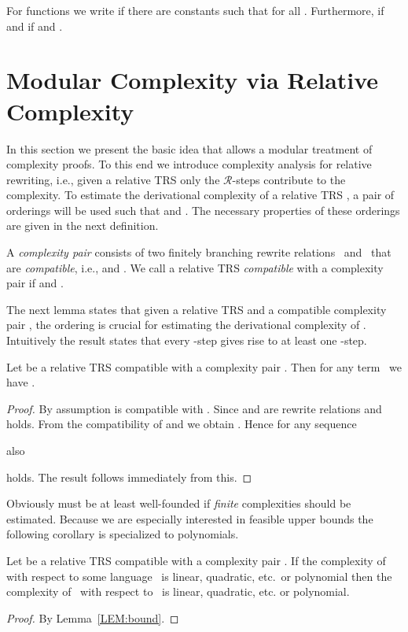 \documentclass{LMCS}
\theoremstyle{plain}\newtheorem{mainthm}[thm]{Main Theorem}
\newcommand\TRS[1]{\ensuremath{\mathcal{#1}}}
\newlength{\mylength}
\newcommand\setl[1]{\settowidth\mylength{#1}}
\begin{document}
For functions  we write  if there
are constants  such that  for
all . Furthermore,  if  and  if
 and .

\section{Modular Complexity via Relative Complexity}
\label{REL:main}

In this section we present the basic idea that allows a modular treatment of
complexity proofs. To this end we introduce complexity analysis for relative
rewriting, i.e., given a relative TRS  only the
\TRS{R}-steps contribute to the complexity. To estimate the derivational
complexity of a relative TRS , a pair of orderings
 will be used such that  and
. The necessary properties of these orderings
are given in the next definition.

\begin{defi}
A \emph{complexity pair}  consists of two finitely
branching rewrite relations~ and~ that are
\emph{compatible}, i.e.,  and
.
We call a relative TRS  \emph{compatible} with a
complexity pair  if 
and .
\end{defi}

The next lemma states that given a relative TRS 
and a compatible complexity pair , the 
ordering is crucial for estimating the derivational complexity of
. Intuitively the result states that every
-step gives rise to at least one -step.

\begin{lem}
\label{LEM:bound}
Let  be a relative TRS
compatible with a complexity pair .
Then for any term~ we have
.
\end{lem}
\begin{proof}
By assumption  is compatible with .
Since  and  are rewrite relations
 and 
holds. From the compatibility of  and  we obtain
.
Hence for any sequence
\setl{}

also

holds. The result follows immediately from this.
\end{proof}

Obviously  must be at least well-founded if \emph{finite} complexities
should be estimated. Because we are especially interested in feasible upper
bounds the following corollary is specialized to polynomials.

\begin{cor}
\label{COR:bound}
Let  be a relative TRS compatible with a
complexity pair . If the complexity of~
with respect to some language~ is linear, quadratic, etc.\
or polynomial then the complexity of~ with
respect to~ is linear, quadratic, etc. or polynomial.
\end{cor}
\begin{proof}
By Lemma~\ref{LEM:bound}.
\end{proof}
\end{document}
